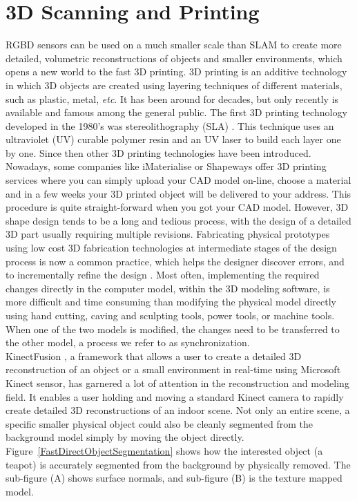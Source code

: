 \section{3D Scanning and Printing}
\gls{RGBD} sensors can be used on a much smaller scale than \gls{SLAM} to create more detailed, volumetric reconstructions of objects and smaller environments, which opens a new world to the fast \gls{3D} printing. \gls{3D} printing is an additive technology in which \gls{3D} objects are created using layering techniques of different materials, such as plastic, metal, \textit{etc}.  It has been around for decades, but only recently is available and famous among the general public. The first \gls{3D} printing technology developed in the 1980's was stereolithography (SLA) \cite{Patent3Dprinting86}. This technique uses an ultraviolet (UV) curable polymer resin and an UV laser to build each layer one by one. Since then other \gls{3D} printing technologies have been introduced. Nowadays, some companies like iMaterialise or Shapeways offer \gls{3D} printing services where you can simply upload your CAD model on-line, choose a material and in a few weeks your \gls{3D} printed object will be delivered to your address. This procedure is quite straight-forward when you got your CAD model. However, \gls{3D} shape design tends to be a long and tedious process, with the design of a detailed \gls{3D} part usually requiring multiple revisions. Fabricating physical prototypes using low cost \gls{3D} fabrication technologies at intermediate stages of the design process is now a common practice, which helps the designer discover errors, and to incrementally refine the design \cite{3DModelingForPrinting15}. Most often, implementing the required changes directly in the computer model, within the \gls{3D} modeling software, is more difficult and time consuming than modifying the physical model directly using hand cutting, caving and sculpting tools, power tools, or machine tools. When one of the two models is modified, the changes need to be transferred to the other model, a process we refer to as synchronization. 
\\\indent
KinectFusion \cite{KinectFusionIzadi_2011}, a framework that allows a user to create a detailed \gls{3D} reconstruction of an object or a small environment in real-time using Microsoft Kinect sensor, has garnered a lot of attention in the reconstruction and modeling field. It enables a user holding and moving a standard Kinect camera to rapidly create detailed \gls{3D} reconstructions of an indoor scene. Not only an entire scene, a specific smaller physical object could also be cleanly segmented from the background model simply by moving the object directly. Figure~\ref{FastDirectObjectSegmentation} shows how the interested object (a teapot) is accurately segmented from the background by physically removed. The sub-figure (A) shows surface normals, and sub-figure (B) is the texture mapped model. %
